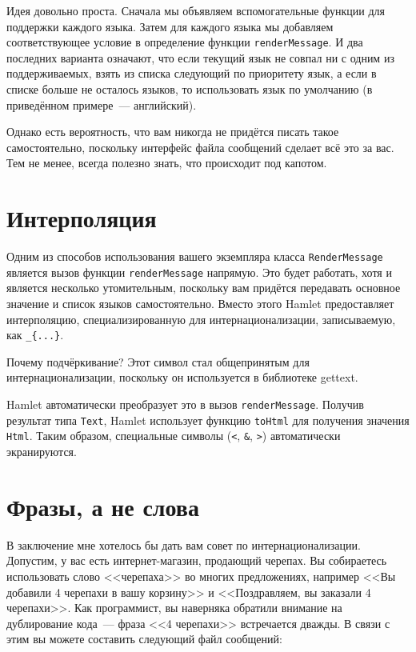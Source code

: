 Идея довольно проста. Сначала мы объявляем вспомогательные функции для
поддержки каждого языка. Затем для каждого языка мы добавляем соответствующее
условие в определение функции \lstinline'renderMessage'. И два последних
варианта означают, что если текущий язык не совпал ни с одним из
поддерживаемых, взять из списка следующий по приоритету язык, а если в списке
больше не осталось языков, то использовать язык по умолчанию (в приведённом
примере~--- английский).

Однако есть вероятность, что вам никогда не придётся писать такое
самостоятельно, поскольку интерфейс файла сообщений сделает всё это за вас. Тем
не менее, всегда полезно знать, что происходит под капотом.

\section{Интерполяция}

Одним из способов использования вашего экземпляра класса
\lstinline'RenderMessage' является вызов функции \lstinline'renderMessage'
напрямую. Это будет работать, хотя и является несколько утомительным, поскольку
вам придётся передавать основное значение и список языков самостоятельно.
Вместо этого Hamlet предоставляет интерполяцию, специализированную для
интернационализации, записываемую, как \lstinline'_{...}'.

\begin{remark}
    Почему подчёркивание? Этот символ стал общепринятым для
    интернационализации, поскольку он используется в библиотеке gettext.
\end{remark}

Hamlet автоматически преобразует это в вызов \lstinline'renderMessage'. Получив
результат типа \lstinline'Text', Hamlet использует функцию \lstinline'toHtml'
для получения значения \lstinline'Html'. Таким образом, специальные символы
(\verb'<', \verb'&', \verb'>') автоматически экранируются.

\section{Фразы, а не слова}

В заключение мне хотелось бы дать вам совет по интернационализации. Допустим, у
вас есть интернет-магазин, продающий черепах. Вы собираетесь использовать слово
<<черепаха>> во многих предложениях, например <<Вы добавили 4 черепахи в вашу
корзину>> и <<Поздравляем, вы заказали 4 черепахи>>. Как программист, вы
наверняка обратили внимание на дублирование кода~--- фраза <<4 черепахи>>
встречается дважды. В связи с этим вы можете составить следующий файл
сообщений:


